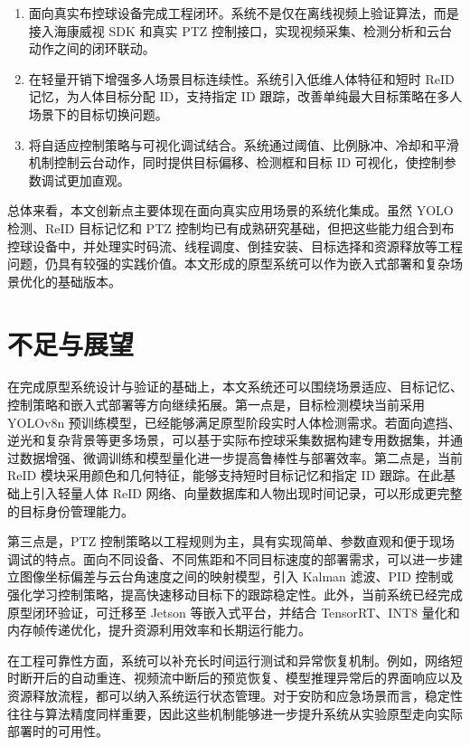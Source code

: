 \begin{enumerate}
    \item 面向真实布控球设备完成工程闭环。系统不是仅在离线视频上验证算法，而是接入海康威视 SDK 和真实 PTZ 控制接口，实现视频采集、检测分析和云台动作之间的闭环联动。
    \item 在轻量开销下增强多人场景目标连续性。系统引入低维人体特征和短时 ReID 记忆，为人体目标分配 ID，支持指定 ID 跟踪，改善单纯最大目标策略在多人场景下的目标切换问题。
    \item 将自适应控制策略与可视化调试结合。系统通过阈值、比例脉冲、冷却和平滑机制控制云台动作，同时提供目标偏移、检测框和目标 ID 可视化，使控制参数调试更加直观。
\end{enumerate}

总体来看，本文创新点主要体现在面向真实应用场景的系统化集成。虽然 YOLO 检测、ReID 目标记忆和 PTZ 控制均已有成熟研究基础，但把这些能力组合到布控球设备中，并处理实时码流、线程调度、倒挂安装、目标选择和资源释放等工程问题，仍具有较强的实践价值。本文形成的原型系统可以作为嵌入式部署和复杂场景优化的基础版本。

\section{不足与展望}

在完成原型系统设计与验证的基础上，本文系统还可以围绕场景适应、目标记忆、控制策略和嵌入式部署等方向继续拓展。第一点是，目标检测模块当前采用 YOLOv8n 预训练模型，已经能够满足原型阶段实时人体检测需求。若面向遮挡、逆光和复杂背景等更多场景，可以基于实际布控球采集数据构建专用数据集，并通过数据增强、微调训练和模型量化进一步提高鲁棒性与部署效率。第二点是，当前 ReID 模块采用颜色和几何特征，能够支持短时目标记忆和指定 ID 跟踪。在此基础上引入轻量人体 ReID 网络、向量数据库和人物出现时间记录，可以形成更完整的目标身份管理能力。

第三点是，PTZ 控制策略以工程规则为主，具有实现简单、参数直观和便于现场调试的特点。面向不同设备、不同焦距和不同目标速度的部署需求，可以进一步建立图像坐标偏差与云台角速度之间的映射模型，引入 Kalman 滤波、PID 控制或强化学习控制策略，提高快速移动目标下的跟踪稳定性。此外，当前系统已经完成原型闭环验证，可迁移至 Jetson 等嵌入式平台，并结合 TensorRT、INT8 量化和内存帧传递优化，提升资源利用效率和长期运行能力。

在工程可靠性方面，系统可以补充长时间运行测试和异常恢复机制。例如，网络短时断开后的自动重连、视频流中断后的预览恢复、模型推理异常后的界面响应以及资源释放流程，都可以纳入系统运行状态管理。对于安防和应急场景而言，稳定性往往与算法精度同样重要，因此这些机制能够进一步提升系统从实验原型走向实际部署时的可用性。

